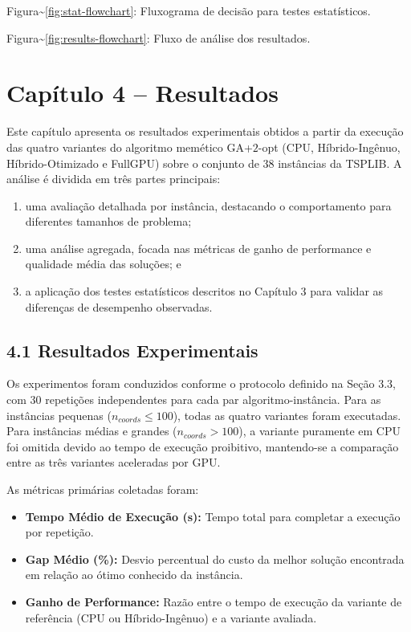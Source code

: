 Figura\textasciitilde{}\ref{fig:stat-flowchart}: Fluxograma de decisão
para testes estatísticos.

Figura\textasciitilde{}\ref{fig:results-flowchart}: Fluxo de análise dos
resultados.

\section{Capítulo 4 -- Resultados}\label{cap4-resultados}

Este capítulo apresenta os resultados experimentais obtidos a partir da
execução das quatro variantes do algoritmo memético GA+\(2\)-opt (CPU,
Híbrido-Ingênuo, Híbrido-Otimizado e FullGPU) sobre o conjunto de 38
instâncias da TSPLIB. A análise é dividida em três partes principais:

\begin{enumerate}
\def\labelenumi{\arabic{enumi}.}
\tightlist
\item
  uma avaliação detalhada por instância, destacando o comportamento para
  diferentes tamanhos de problema;
\item
  uma análise agregada, focada nas métricas de ganho de performance e
  qualidade média das soluções; e
\item
  a aplicação dos testes estatísticos descritos no Capítulo 3 para
  validar as diferenças de desempenho observadas.
\end{enumerate}

\subsection{4.1 Resultados
Experimentais}\label{sec-41-resultados-experimentais}

Os experimentos foram conduzidos conforme o protocolo definido na Seção
3.3, com 30 repetições independentes para cada par algoritmo-instância.
Para as instâncias pequenas (\(n_{coords} \le 100\)), todas as quatro
variantes foram executadas. Para instâncias médias e grandes
(\(n_{coords} > 100\)), a variante puramente em CPU foi omitida devido
ao tempo de execução proibitivo, mantendo-se a comparação entre as três
variantes aceleradas por GPU.

As métricas primárias coletadas foram:

\begin{itemize}
\tightlist
\item
  \textbf{Tempo Médio de Execução (s):} Tempo total para completar a
  execução por repetição.
\item
  \textbf{Gap Médio (\%):} Desvio percentual do custo da melhor solução
  encontrada em relação ao ótimo conhecido da instância.
\item
  \textbf{Ganho de Performance:} Razão entre o tempo de execução da
  variante de referência (CPU ou Híbrido-Ingênuo) e a variante avaliada.
\end{itemize}

